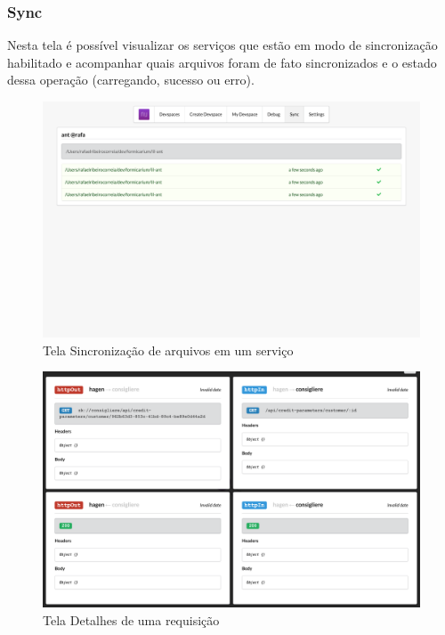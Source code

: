         \subsubsection{Sync}
            Nesta tela é possível visualizar os serviços que estão em modo de sincronização habilitado e acompanhar quais arquivos foram de fato sincronizados e o estado dessa operação (carregando, sucesso ou erro).



            \begin{figure}[htb]
        		\caption{\label{fig_frontend_sync}Tela Sincronização de arquivos em um serviço}
        		\begin{center}
        		\includegraphics[width=\textwidth,keepaspectratio]{pictures/frontend/frontend-sync.png}
        		\end{center}
        	\end{figure}
	
    \begin{figure}[htb]
		\caption{\label{fig_frontend_tracing_details}Tela Detalhes de uma requisição}
		\begin{center}
		\includegraphics[width=\textwidth,keepaspectratio]{pictures/frontend/frontend-tracing-details.png}
		\end{center}
	\end{figure}
	
